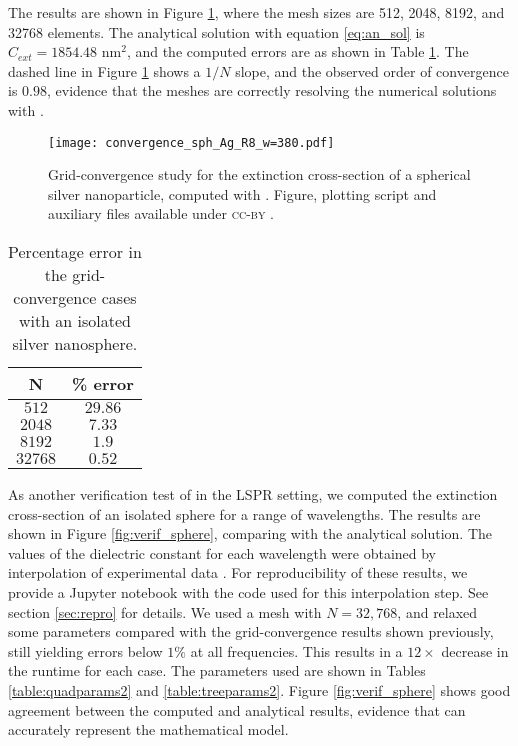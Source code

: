 The results are shown in Figure \ref{fig:error_sphere_Ag}, where the mesh sizes are
512, 2048, 8192, and 32768 elements. 
The analytical solution with equation \eqref{eq:an_sol} is $C_{ext} = 1854.48$ nm$^2$, 
and the computed errors are as shown in Table \ref{table:err_iso_sphere}.
The dashed line in Figure \ref{fig:error_sphere_Ag} shows a $1/N$ slope, 
and the observed order of convergence is $0.98$,  
evidence that the meshes are correctly resolving the numerical solutions with \pygbe. 


\begin{figure}[h] %
   \centering
   \texttt{[image: convergence\_sph\_Ag\_R8\_w=380.pdf]} 
   \caption{Grid-convergence study for the extinction cross-section of a spherical silver
            nanoparticle, computed with \pygbe. Figure, plotting script and auxiliary files available under \textsc{cc-by} \cite{ClementiETal2018c}.}
   \label{fig:error_sphere_Ag}
\end{figure}



\begin{table}[h]
    \centering
    \caption{\label{table:err_iso_sphere} Percentage error in the grid-convergence cases with an isolated silver nanosphere.} 
    \begin{tabular}{c c}
    \hline%
    N & \% error \\
    \hline%
     $512$ & $29.86$ \\
     $2048$ & $7.33$ \\
     $8192$ & $1.9$ \\
     $32768$ & $0.52$ \\
    \hline%
    \end{tabular}
\end{table}

As another verification test of \pygbe in the LSPR setting, we computed the extinction cross-section of an 
isolated sphere for a range of wavelengths. 
The results are shown in Figure \ref{fig:verif_sphere}, comparing with the analytical solution. 
The values of the dielectric constant for each wavelength were obtained by interpolation of 
experimental data \cite{JohnsonChristy1972, HaleQuerry1972}.
For reproducibility of these results, we provide a Jupyter notebook with the code used for this interpolation step.
See section \ref{sec:repro} for details.
We used a mesh with $N=32,768$, and relaxed some parameters compared with the grid-convergence results shown previously, still yielding errors below $1\%$ at all frequencies.
This results in a $12\times$ decrease in the runtime for each case.
The parameters used are shown in Tables \ref{table:quadparams2} and \ref{table:treeparams2}.
Figure \ref{fig:verif_sphere} shows good agreement between the computed and analytical results, 
evidence that \pygbe can accurately represent the mathematical model. 


